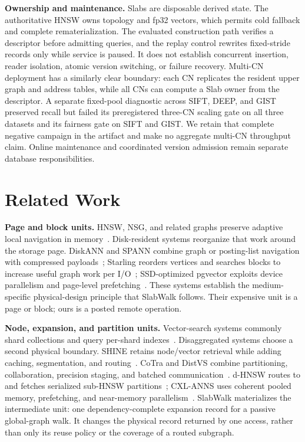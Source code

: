 \documentclass[sigconf,nonacm]{acmart}
\begin{document}
\textbf{Ownership and maintenance.}
Slabs are disposable derived state.  The authoritative HNSW owns topology and
fp32 vectors, which permits cold fallback and complete rematerialization.  The
evaluated construction path verifies a descriptor before admitting queries,
and the replay control rewrites fixed-stride records only while service is
paused.  It does not establish concurrent insertion, reader isolation, atomic
version switching, or failure recovery.  Multi-CN deployment has a similarly
clear boundary: each CN replicates the resident upper graph and address tables,
while all CNs can compute a Slab owner from the descriptor.  A separate
fixed-pool diagnostic across SIFT, DEEP, and GIST preserved recall but failed
its preregistered three-CN scaling gate on all three datasets and its fairness
gate on SIFT and GIST.  We retain that complete negative campaign in the
artifact and make no aggregate multi-CN throughput claim.  Online maintenance
and coordinated version admission remain separate database responsibilities.

\section{Related Work}
\label{sec:related}

\textbf{Page and block units.}
HNSW, NSG, and related graphs preserve adaptive local navigation in
memory~\cite{hnsw,nsg,wangsurvey}.  Disk-resident systems reorganize that work
around the storage page.  DiskANN and SPANN combine graph or posting-list
navigation with compressed payloads~\cite{diskann,spann}; Starling reorders
vertices and searches blocks to increase useful graph work per I/O~\cite{starling};
SSD-optimized pgvector exploits device parallelism and page-level
prefetching~\cite{ssdpgvector}.  These systems establish the medium-specific
physical-design principle that SlabWalk follows.  Their expensive unit is a
page or block; ours is a posted remote operation.

\textbf{Node, expansion, and partition units.}
Vector-search systems commonly shard collections and query per-shard
indexes~\cite{milvus,manu,faiss,faissgpu}.  Disaggregated systems choose a
second physical boundary.  SHINE retains node/vector retrieval while adding
caching, segmentation, and routing~\cite{shine}.  CoTra and DistVS combine
partitioning, collaboration, precision staging, and batched
communication~\cite{cotra,distvs}.  d-HNSW routes to and fetches serialized
sub-HNSW partitions~\cite{dhnsw}; CXL-ANNS uses coherent pooled memory,
prefetching, and near-memory parallelism~\cite{cxlanns}.  SlabWalk materializes
the intermediate unit: one dependency-complete expansion record for a passive
global-graph walk.  It changes the physical record returned by one access,
rather than only its reuse policy or the coverage of a routed subgraph.
\end{document}
